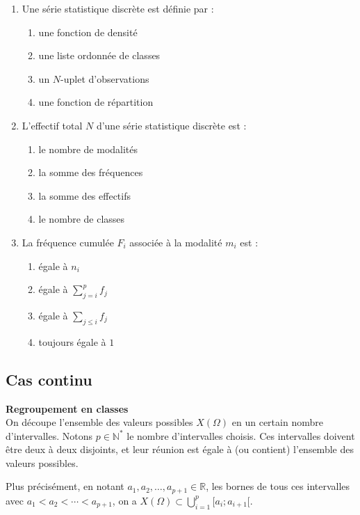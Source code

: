\documentclass[../PolyS4.tex]{subfiles}
\begin{document}
\begin{enumerate}
\item Une série statistique discrète est définie par :
\begin{enumerate}
\item une fonction de densité
\item une liste ordonnée de classes
\item un $N$-uplet d'observations
\item une fonction de répartition
\end{enumerate}

\item L'effectif total $N$ d'une série statistique discrète est :
\begin{enumerate}
\item le nombre de modalités
\item la somme des fréquences
\item la somme des effectifs
\item le nombre de classes
\end{enumerate}

\item La fréquence cumulée $F_i$ associée à la modalité $m_i$ est :
\begin{enumerate}
\item égale à $n_i$
\item égale à $\sum_{j=i}^p f_j$
\item égale à $\sum_{j \le i} f_j$
\item toujours égale à $1$
\end{enumerate}
\end{enumerate}

\subsection{Cas continu}

\begin{Meth}\textbf{Regroupement en classes}\\

On découpe l'ensemble des valeurs possibles $X(\Omega)$ en un certain nombre d'intervalles. Notons $p \in \mathbb{N}^*$ le nombre d'intervalles choisis. Ces intervalles doivent être deux à deux disjoints, et leur réunion est égale à (ou contient) l'ensemble des valeurs possibles.

Plus précisément, en notant $a_1, a_2, \ldots, a_{p+1} \in \mathbb{R}$, les bornes de tous ces intervalles avec $a_1 < a_2 < \cdots < a_{p+1}$, on a $X(\Omega) \subset \bigcup_{i=1}^{p} [a_i; a_{i+1}[$.
\end{Meth}
\end{document}
